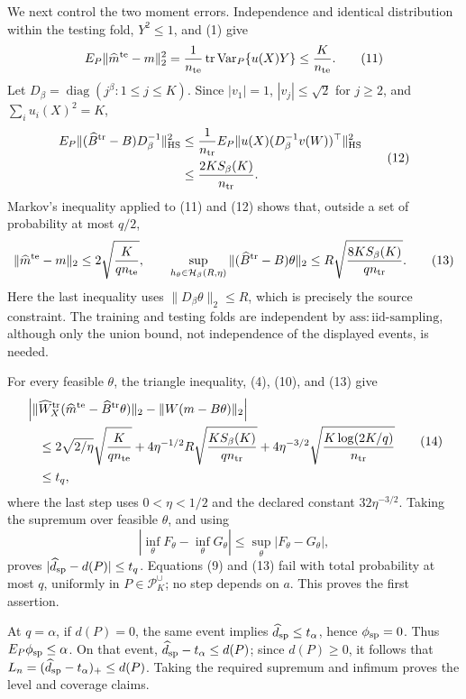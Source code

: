 We next control the two moment errors.  Independence and identical distribution within the testing fold, \(Y^2\le1\), and (1) give
\[
 E_P\|\widehat m^{\rm te}-m\|_2^2
 =\frac1{n_{\rm te}}\operatorname{tr}\operatorname{Var}_P\{u(X)Y\}
 \le\frac K{n_{\rm te}}. \tag{11}
\]
Let \(D_\beta=\operatorname{diag}(j^\beta:1\le j\le K)\).  Since \(|v_1|=1\), \(|v_j|\le\sqrt2\) for \(j\ge2\), and \(\sum_i u_i(X)^2=K\),
\[
 \begin{split}
 E_P\| (\widehat B^{\rm tr}-B)D_\beta^{-1}\|_{\rm HS}^2
 &\le \frac1{n_{\rm tr}}E_P\|u(X)(D_\beta^{-1}v(W))^\top\|_{\rm HS}^2\\
 &\le \frac{2KS_\beta(K)}{n_{\rm tr}}.
 \end{split}\tag{12}
\]
Markov's inequality applied to (11) and (12) shows that, outside a set of probability at most \(q/2\),
\[
 \|\widehat m^{\rm te}-m\|_2\le2\sqrt{\frac K{q n_{\rm te}}},
 \qquad
 \sup_{h_\theta\in\mathcal H_\beta(R,\eta)}
 \|(\widehat B^{\rm tr}-B)\theta\|_2
 \le R\sqrt{\frac{8KS_\beta(K)}{q n_{\rm tr}}}. \tag{13}
\]
Here the last inequality uses \(\|D_\beta\theta\|_2\le R\), which is precisely the source constraint.  The training and testing folds are independent by \(\mathrm{ass:iid\mbox{-}sampling}\), although only the union bound, not independence of the displayed events, is needed.

For every feasible \(\theta\), the triangle inequality, (4), (10), and (13) give
\[
 \begin{split}
 &\left|\|\widehat W_X^{\rm tr}(\widehat m^{\rm te}-\widehat B^{\rm tr}\theta)\|_2
 -\|W(m-B\theta)\|_2\right|\\
 &\quad\le
 2\sqrt{2/\eta}\sqrt{\frac K{q n_{\rm te}}}
 +4\eta^{-1/2}R\sqrt{\frac{KS_\beta(K)}{q n_{\rm tr}}}
 +4\eta^{-3/2}\sqrt{\frac{K\log(2K/q)}{n_{\rm tr}}}\\
 &\quad\le t_q,
 \end{split}\tag{14}
\]
where the last step uses \(0<\eta<1/2\) and the declared constant \(32\eta^{-3/2}\).  Taking the supremum over feasible \(\theta\), and using
\[
 \left|\inf_\theta F_\theta-\inf_\theta G_\theta\right|
 \le\sup_\theta|F_\theta-G_\theta|, \tag{15}
\]
proves \(|\widehat d_{\rm sp}-d(P)|\le t_q\).  Equations (9) and (13) fail with total probability at most \(q\), uniformly in \(P\in\mathcal P_K^\cup\); no step depends on \(a\).  This proves the first assertion.

At \(q=\alpha\), if \(d(P)=0\), the same event implies \(\widehat d_{\rm sp}\le t_\alpha\), hence \(\phi_{\rm sp}=0\).  Thus \(E_P\phi_{\rm sp}\le\alpha\).  On that event, \(\widehat d_{\rm sp}-t_\alpha\le d(P)\); since \(d(P)\ge0\), it follows that \(L_n=(\widehat d_{\rm sp}-t_\alpha)_+\le d(P)\).  Taking the required supremum and infimum proves the level and coverage claims.

